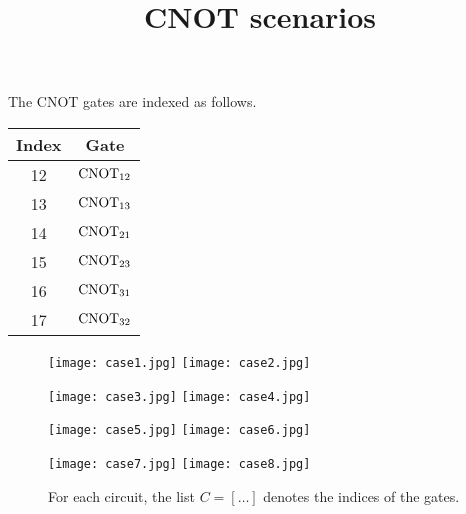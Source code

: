 \documentclass[11pt]{article}
\title{CNOT scenarios}
\date{}
\def\C{\rm CNOT}
\begin{document}
\maketitle

The CNOT gates are indexed as follows.
\begin{tabular}{|c|c|}
\hline
Index & Gate \\
\hline
12 & $\C_{12}$ \\
13 & $\C_{13}$ \\
14 & $\C_{21}$ \\
15 & $\C_{23}$ \\
16 & $\C_{31}$ \\
17 & $\C_{32}$ \\
\hline
\end{tabular}


\begin{figure}[H]
\begin{center}
\texttt{[image: case1.jpg]}	\texttt{[image: case2.jpg]}

\texttt{[image: case3.jpg]}	\texttt{[image: case4.jpg]}

\vspace{0.5cm}

\texttt{[image: case5.jpg]}	\texttt{[image: case6.jpg]}

\vspace{0.5cm}

\texttt{[image: case7.jpg]}	\texttt{[image: case8.jpg]}
\caption{For each circuit, the list $C = [\ldots]$ denotes the indices of the gates.}
\label{fit:cnots}
\end{center}
\end{figure}
\end{document}
